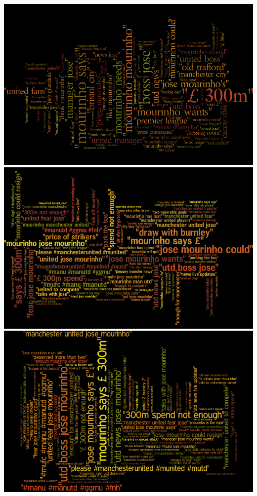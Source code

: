 \documentclass[14pt, openany]{article}
\begin{document}
\begin{center}
\includegraphics[scale=0.6]{Images/jose_bigram.png}
\includegraphics[scale=0.6]{Images/mourinho_trigram.png}
\includegraphics[scale=0.6]{Images/mourinho_quadrigram.png}
\end{center}
\end{document}
